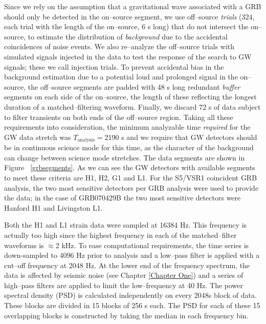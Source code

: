 Since we rely on the assumption that a gravitational wave associated with a GRB should only be detected in the on--source segment, we use off--source \emph{trials} (324, each trial with the length of the on--source, 6 s long) that do not intersect the on--source, to estimate the distribution of \emph{background} due to the accidental coincidences of noise events. We also re--analyze the off--source trials with simulated signals injected in the data to test the response of the search to GW signals; these we call injection trials. To prevent accidental bias in the background estimation due to a potential loud and prolonged signal in the on--source, the off--source segments are padded with 48 s long redundant \emph{buffer} segments on each side of the on--source, the length of these reflecting the longest duration of a matched--filtering waveform. Finally, we discard 72 s of data subject to filter transients on both ends of the off--source region. Taking all these requirements into consideration, the minimum analyzable time \emph{required} for the GW data stretch was $T_{\mathrm{analysis}}=$2190 s and we require that GW detectors should be in continuous science mode for this time, as the character of the background can change between science mode stretches. The data segments are shown in Figure ~\ref{grbsegments}. As we can see the GW detectors with available segments to meet these criteria are H1, H2, G1 and L1. For the S5/VSR1 coincident GRB analysis, the two most sensitive detectors per GRB analysis were used to provide the data; in the case of GRB070429B the two most sensitive detectors were Hanford H1 and Livingston L1.

Both the H1 and L1 strain data were sampled at 16384 Hz. This frequency is actually too high since the highest frequency in each of the matched--filter waveforms is $\approx$2 kHz. To ease computational requirements, the time series is down-sampled to 4096 Hz prior to analysis and a low--pass filter is applied with a cut--off frequency at 2048 Hz. At the lower end of the frequency spectrum, the data is affected by seismic noise (see Chapter \ref{Chapter One}) and a series of high--pass filters are applied to limit the low--frequency at 40 Hz. The power spectral density (PSD) is calculated independently on every 2048s block of data. These blocks are divided in 15 blocks of 256 s each. The PSD for each of these 15 overlapping blocks is constructed by taking the median in each frequency bin. 

